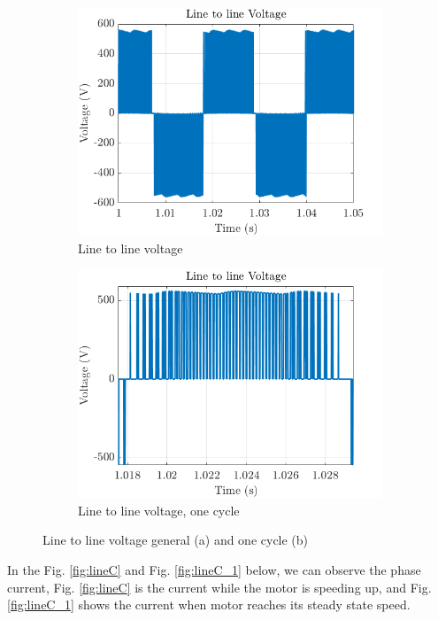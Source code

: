 \begin{figure}[H]
        \centering
        \begin{subfigure}[b]{0.475\textwidth}
            \centering
            \includegraphics[width = 7 cm]{figs/lineVoltage.png}
            \caption{Line to line voltage}
            \label{fig:3line}
        \end{subfigure}
        \hfill
        \begin{subfigure}[b]{0.475\textwidth}  
            \centering 
            \includegraphics[width = 7 cm]{figs/lineVoltage_zoom.png}
            \caption{Line to line voltage, one cycle}
            \label{fig:3line_1}
        \end{subfigure}
        \caption{Line to line voltage general (a) and one cycle (b)}
        \label{fig:3phase}
        \end{figure}
        
In the Fig. \ref{fig:lineC} and Fig. \ref{fig:lineC_1} below, we can observe the phase current, Fig. \ref{fig:lineC} is the current while the motor is speeding up, and Fig. \ref{fig:lineC_1} shows the current when motor reaches its steady state speed.


